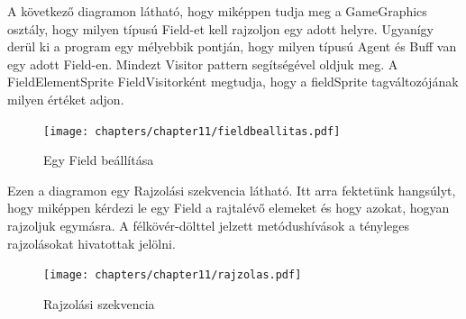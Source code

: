 A következő diagramon látható, hogy miképpen tudja meg a GameGraphics osztály, hogy milyen típusú Field-et kell rajzoljon egy adott helyre. Ugyanígy derül ki a program egy mélyebbik pontján, hogy milyen típusú Agent és Buff van egy adott Field-en. Mindezt Visitor pattern segítségével oldjuk meg. 
A FieldElementSprite FieldVisitorként megtudja, hogy a fieldSprite tagváltozójának milyen értéket adjon.

\begin{figure}[h]
    \begin{center}
        \texttt{[image: chapters/chapter11/fieldbeallitas.pdf]}
        \caption{Egy Field beállítása}
        \label{fig:fieldbeallitas}
    \end{center}
\end{figure}


Ezen a diagramon egy Rajzolási szekvencia látható. Itt arra fektetünk hangsúlyt, hogy miképpen kérdezi le egy Field a rajtalévő elemeket és hogy azokat, hogyan rajzoljuk egymásra. A félkövér-dölttel jelzett metódushívások a tényleges rajzolásokat hivatottak jelölni.

\begin{figure}[h]
    \begin{center}
        \texttt{[image: chapters/chapter11/rajzolas.pdf]}
        \caption{Rajzolási szekvencia}
        \label{fig:rajzolas}
    \end{center}
\end{figure}